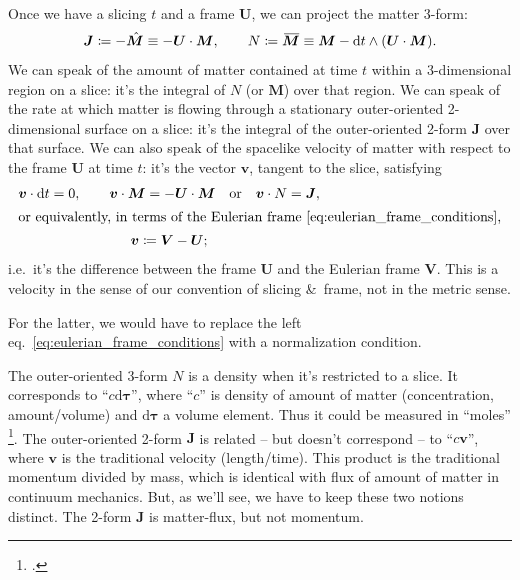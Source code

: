 \documentclass[\ifafour a4paper,12pt,\else a5paper,10pt,\fi%
onecolumn,oneside,article,%
british%
]{memoir}
\theoremstyle{remark}
\theoremstyle{innote}
\newcommand*{\citep}{\footcites}
\newcommand*{\amp}{\&}
\newcommand*{\di}{\mathrm{d}}%
\newcommand*{\defd}{\coloneqq}
\renewcommand*{\|}[1][]{\nonscript\,#1\vert\nonscript\;\mathopen{}}
\newcommand*{\eqn}{eq.}%
\newcommand*{\ie}{{i.e.}}
\newcommand*{\widebar}[1]{{\mkern1.5mu\skew{2}\overline{\mkern-1.5mu#1\mkern-1.5mu}\mkern 1.5mu}}
\newcommand*{\yd}{N}
\newcommand*{\yrr}{M}
\newcommand*{\yr}{\bm{\yrr}}
\newcommand*{\yjj}{J}
\newcommand*{\yj}{\bm{\yjj}}
\newcommand*{\yvvt}{v}
\newcommand*{\yvt}{\bm{\yvvt}}
\newcommand*{\yFF}{U}
\newcommand*{\yF}{\bm{\yFF}}
\newcommand*{\ynn}{V}
\newcommand*{\yn}{\bm{\ynn}}
\begin{document}
Once we have a slicing $t$ and a frame $\yF$, we can project the matter
3-form:
\begin{equation}
  \label{eq:project_matter_form}
  \yj \defd  -\Hat{\yr} \equiv -\yF\cdot\yr,
  \qquad
  \yd \defd \widebar{\yr} \equiv \yr - \di t \land (\yF\cdot\yr).
\end{equation}
We can speak of the amount of matter contained at time $t$ within a
3-dimensional region on a slice: it's the integral of $\yd$ (or $\yr$) over
that region. We can speak of the rate at which matter is flowing through a
stationary outer-oriented 2-dimensional surface on a slice: it's the
integral of the outer-oriented 2-form $\yj$ over that surface. We can also
speak of the spacelike velocity of matter with respect to the frame $\yF$
at time $t$: it's the vector $\yvt$, tangent to the slice, satisfying
\begin{subequations}
  \label{eq:matter_velocity_in_frame}
  \begin{gather}
    \yvt \cdot \di t = 0, \qquad
    \yvt \cdot \yr = - \yF \cdot \yr
    \quad\text{or}\quad
    \yvt \cdot \yd = \yj,
    \\
    \shortintertext{or equivalently, in terms of the Eulerian frame~\eqref{eq:eulerian_frame_conditions},}
    \yvt \defd \yn-\yF;
  \end{gather}
\end{subequations}
\ie\ it's the difference between the frame $\yF$ and the Eulerian frame
$\yn$. This is a velocity in the sense of our convention of slicing \amp\
frame, not in the metric sense.



For the latter, we would have to replace
the left \eqn~\eqref{eq:eulerian_frame_conditions} with a normalization
condition.

The outer-oriented 3-form $\yd$ is a density when it's restricted to a
slice. It corresponds to \enquote{$c\di\bm{\tau}$}, where \enquote{$c$} is
density of amount of matter (concentration, amount/volume) and
{$\di\bm{\tau}$} a volume element. Thus it could be measured in
\enquote{moles} \citep{iso2009,iso2009d,jcgm1997_r2012}. The outer-oriented
2-form $\yj$ is related -- but doesn't correspond -- to
\enquote{$c\bm{v}$}, where {$\bm{v}$} is the traditional velocity
(length/time). This product is the traditional momentum divided by mass,
which is identical with flux of amount of matter in continuum mechanics.
But, as we'll see, we have to keep these two notions distinct. The 2-form
$\yj$ is matter-flux, but not momentum.
\end{document}
